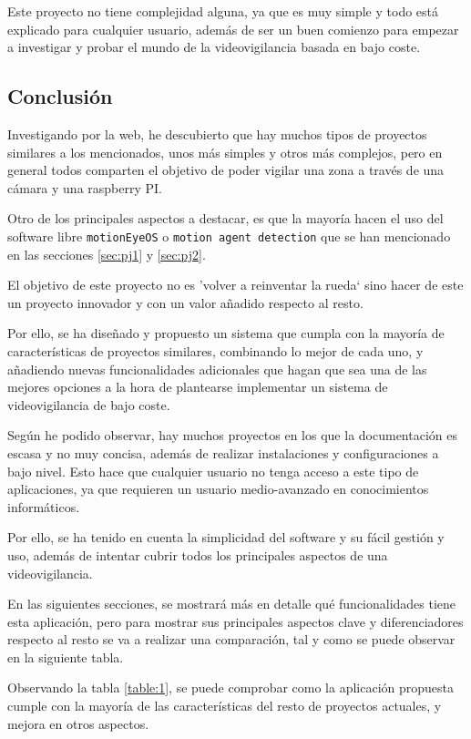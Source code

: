 Este proyecto no tiene complejidad alguna, ya que es muy simple y todo está explicado para cualquier usuario, además de ser un buen comienzo para empezar a investigar y probar el mundo de la videovigilancia basada en bajo coste.

\subsection{Conclusión}

Investigando por la web, he descubierto que hay muchos tipos de proyectos similares a los mencionados, unos más simples y otros más complejos, pero en general todos comparten el objetivo de poder vigilar una zona a través de una cámara y una raspberry PI.

\newpage

Otro de los principales aspectos a destacar, es que la mayoría hacen el uso del software libre \texttt{motionEyeOS} o \texttt{motion agent detection} que se han mencionado en las secciones \ref{sec:pj1} y \ref{sec:pj2}.

El objetivo de este proyecto no es 'volver a reinventar la rueda` sino hacer de este un proyecto innovador y con un valor añadido respecto al resto.

Por ello, se ha diseñado y propuesto un sistema que cumpla con la mayoría de características de proyectos similares, combinando lo mejor de cada uno, y añadiendo nuevas funcionalidades adicionales que hagan que sea una de las mejores opciones a la hora de plantearse implementar un sistema de videovigilancia de bajo coste.

Según he podido observar, hay muchos proyectos en los que la documentación es escasa y no muy concisa, además de realizar instalaciones y configuraciones a bajo nivel. Esto hace que cualquier usuario no tenga acceso a este tipo de aplicaciones, ya que requieren un usuario medio-avanzado en conocimientos informáticos.

Por ello, se ha tenido en cuenta la simplicidad del software y su fácil gestión y uso, además de intentar cubrir todos los principales aspectos de una videovigilancia.

En las siguientes secciones, se mostrará más en detalle qué funcionalidades tiene esta aplicación, pero para mostrar sus principales aspectos clave y diferenciadores respecto al resto se va a realizar una comparación, tal y como se puede observar en la siguiente tabla.


Observando la tabla \ref{table:1}, se puede comprobar como la aplicación propuesta cumple con la mayoría de las características del resto de proyectos actuales, y mejora en otros aspectos.

